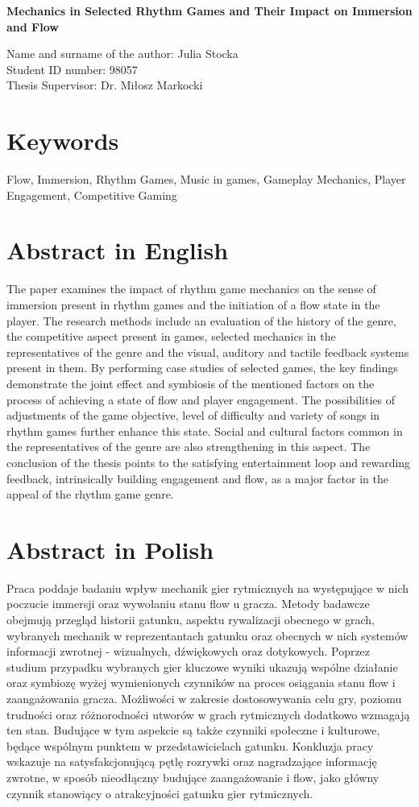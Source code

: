 \begin{center}
   \textbf{\large Mechanics in Selected Rhythm Games and Their Impact on Immersion and Flow}
\end{center}
Name and surname of the author: Julia Stocka \\
Student ID number: 98057 \\
Thesis Supervisor: Dr. Miłosz Markocki

\section*{Keywords}
\noindent
Flow, Immersion, Rhythm Games, Music in games, Gameplay Mechanics, Player Engagement, Competitive Gaming

\section*{Abstract in English}
\noindent
The paper examines the impact of rhythm game mechanics on the sense of immersion present in rhythm games and the initiation of a flow state in the player. The research methods include an evaluation of the history of the genre, the competitive aspect present in games, selected mechanics in the representatives of the genre and the visual, auditory and tactile feedback systems present in them. By performing case studies of selected games, the key findings demonstrate the joint effect and symbiosis of the mentioned factors on the process of achieving a state of flow and player engagement. The possibilities of adjustments of the game objective, level of difficulty and variety of songs in rhythm games further enhance this state. Social and cultural factors common in the representatives of the genre are also strengthening in this aspect. The conclusion of the thesis points to the satisfying entertainment loop and rewarding feedback, intrinsically building engagement and flow, as a major factor in the appeal of the rhythm game genre.

\section*{Abstract in Polish}
Praca poddaje badaniu wpływ mechanik gier rytmicznych na występujące w nich poczucie immersji oraz wywołaniu stanu flow u gracza. Metody badawcze obejmują przegląd historii gatunku, aspektu rywalizacji obecnego w grach, wybranych mechanik w reprezentantach gatunku oraz obecnych w nich systemów informacji zwrotnej - wizualnych, dźwiękowych oraz dotykowych. Poprzez studium przypadku wybranych gier kluczowe wyniki ukazują wspólne działanie oraz symbiozę wyżej wymienionych czynników na proces osiągania stanu flow i zaangażowania gracza. Możliwości w zakresie dostosowywania celu gry, poziomu trudności oraz różnorodności utworów w grach rytmicznych dodatkowo wzmagają ten stan. Budujące w tym aspekcie są także czynniki społeczne i kulturowe, będące wspólnym punktem w przedstawicielach gatunku. Konkluzja pracy wskazuje na satysfakcjonującą pętlę rozrywki oraz nagradzające informację zwrotne, w sposób nieodłączny budujące zaangażowanie i flow, jako główny czynnik stanowiący o atrakcyjności gatunku gier rytmicznych.